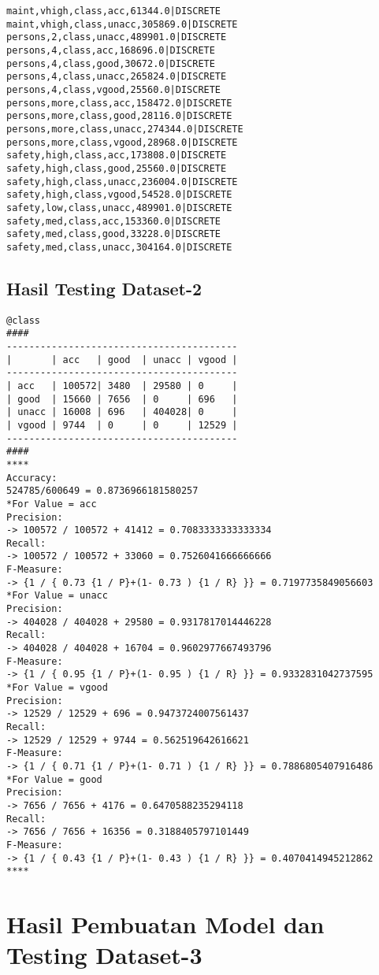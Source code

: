 \begin{lstlisting}
maint,vhigh,class,acc,61344.0|DISCRETE    
maint,vhigh,class,unacc,305869.0|DISCRETE    
persons,2,class,unacc,489901.0|DISCRETE    
persons,4,class,acc,168696.0|DISCRETE    
persons,4,class,good,30672.0|DISCRETE    
persons,4,class,unacc,265824.0|DISCRETE    
persons,4,class,vgood,25560.0|DISCRETE    
persons,more,class,acc,158472.0|DISCRETE    
persons,more,class,good,28116.0|DISCRETE    
persons,more,class,unacc,274344.0|DISCRETE    
persons,more,class,vgood,28968.0|DISCRETE    
safety,high,class,acc,173808.0|DISCRETE    
safety,high,class,good,25560.0|DISCRETE    
safety,high,class,unacc,236004.0|DISCRETE    
safety,high,class,vgood,54528.0|DISCRETE    
safety,low,class,unacc,489901.0|DISCRETE    
safety,med,class,acc,153360.0|DISCRETE    
safety,med,class,good,33228.0|DISCRETE    
safety,med,class,unacc,304164.0|DISCRETE
\end{lstlisting}

\subsection{Hasil Testing Dataset-2}
\label{lamp:E-Hasil Testing Dataset-2}
\begin{lstlisting}
@class
####
-----------------------------------------
|       | acc   | good  | unacc | vgood |
-----------------------------------------
| acc   | 100572| 3480  | 29580 | 0     |
| good  | 15660 | 7656  | 0     | 696   |
| unacc | 16008 | 696   | 404028| 0     |
| vgood | 9744  | 0     | 0     | 12529 |
-----------------------------------------
####    
****
Accuracy:
524785/600649 = 0.8736966181580257
*For Value = acc
Precision:
-> 100572 / 100572 + 41412 = 0.7083333333333334
Recall:
-> 100572 / 100572 + 33060 = 0.7526041666666666
F-Measure:
-> {1 / { 0.73 {1 / P}+(1- 0.73 ) {1 / R} }} = 0.7197735849056603
*For Value = unacc
Precision:
-> 404028 / 404028 + 29580 = 0.9317817014446228
Recall:
-> 404028 / 404028 + 16704 = 0.9602977667493796
F-Measure:
-> {1 / { 0.95 {1 / P}+(1- 0.95 ) {1 / R} }} = 0.9332831042737595
*For Value = vgood
Precision:
-> 12529 / 12529 + 696 = 0.9473724007561437
Recall:
-> 12529 / 12529 + 9744 = 0.562519642616621
F-Measure:
-> {1 / { 0.71 {1 / P}+(1- 0.71 ) {1 / R} }} = 0.7886805407916486
*For Value = good
Precision:
-> 7656 / 7656 + 4176 = 0.6470588235294118
Recall:
-> 7656 / 7656 + 16356 = 0.3188405797101449
F-Measure:
-> {1 / { 0.43 {1 / P}+(1- 0.43 ) {1 / R} }} = 0.4070414945212862
****
\end{lstlisting}

\section{Hasil Pembuatan Model dan Testing Dataset-3}
\label{lamp:E-Hasil Pembuatan Model dan Testing Dataset-3}

